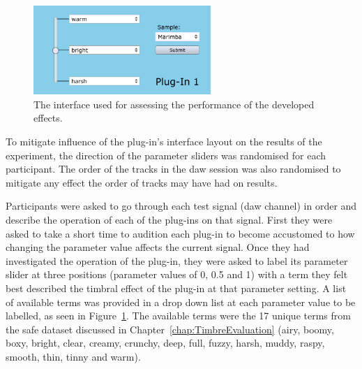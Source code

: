 			\begin{figure}[h!]
				\centering
				\includegraphics[width=0.6\textwidth]{chapter7/Images/TestPlugInInterface.png}
				\caption{The interface used for assessing the performance of the developed effects.}
				\label{fig:TestPlugInterface}
			\end{figure}

			To mitigate influence of the plug-in's interface layout on the results of the experiment, the
			direction of the parameter sliders was randomised for each participant. The order of the tracks in
			the \acrshort{daw} session was also randomised to mitigate any effect the order of tracks may have
			had on results.

			Participants were asked to go through each test signal (\acrshort{daw} channel) in order and
			describe the operation of each of the plug-ins on that signal. First they were asked to take a
			short time to audition each plug-in to become accustomed to how changing the parameter value
			affects the current signal. Once they had investigated the operation of the plug-in, they were
			asked to label its parameter slider at three positions (parameter values of 0, 0.5 and 1) with a
			term they felt best described the timbral effect of the plug-in at that parameter setting. A list
			of available terms was provided in a drop down list at each parameter value to be labelled, as seen
			in Figure~\ref{fig:TestPlugInterface}. The available terms were the 17 unique terms from the
			\acrshort{safe} dataset discussed in Chapter~\ref{chap:TimbreEvaluation} (airy, boomy, boxy,
			bright, clear, creamy, crunchy, deep, full, fuzzy, harsh, muddy, raspy, smooth, thin, tinny and
			warm).

